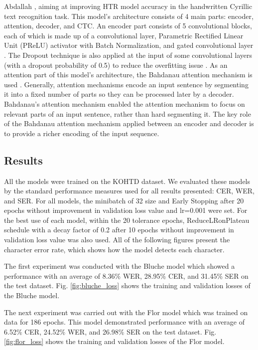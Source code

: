 \documentclass[preprint,12pt]{elsarticle}
\begin{document}
Abdallah \cite{Abdallah_2020}, aiming at improving HTR model accuracy in the handwritten Cyrillic text recognition task. This model's architecture consists of 4 main parts: encoder, attention, decoder, and CTC.
An encoder part consists of 5 convolutional blocks, each of which is made up of a convolutional layer, Parametric Rectified Linear Unit (PReLU) activator \cite{he2015delving} with Batch Normalization, and gated convolutional layer \cite{bluche2017gated}. The Dropout technique is also applied at the input of some convolutional layers (with a dropout probability of 0.5) to reduce the overfitting issue \cite{srivastava2014dropout}.
As an attention part of this model's architecture, the Bahdanau attention mechanism is used \cite{bahdanau2015neural}. Generally, attention mechanisms encode an input sentence by segmenting it into a fixed number of parts so they can be processed later by a decoder. Bahdanau's attention mechanism enabled the attention mechanism to focus on relevant parts of an input sentence, rather than hard segmenting it. The key role of the Bahdanau attention mechanism applied between an encoder and decoder is to provide a richer encoding of the input sequence.

\subsection{Results}

All the models were trained on the KOHTD dataset. We evaluated these models by the standard performance measures used for all results presented: CER, WER, and SER. For all models, the minibatch of 32 size and Early Stopping after 20 epochs without improvement in validation loss value and lr=0.001 were set. For the best use of each model, within the 20 tolerance epochs, ReduceLRonPlateau schedule\cite{vinciarelli2001new} with a decay factor of 0.2 after 10 epochs without improvement in validation loss value was also used. All of the following figures present the character error rate, which shows how the model detects each character.

The first experiment was conducted with the Bluche model which showed a performance with an average of 8.36\% WER, 28.95\%  CER, and 31.45\% SER on the test dataset.  Fig. \ref{fig:bluche_loss} shows the training and validation losses of the Bluche model. 

The next experiment was carried out with the Flor model which was trained on data for 186 epochs. This model demonstrated performance with an average of 6.52\% CER, 24.52\%  WER, and 26.98\% SER on the test dataset. Fig. \ref{fig:flor_loss} shows the training and validation losses of the Flor model.
\end{document}
